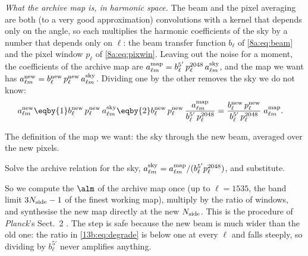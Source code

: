 \emph{What the archive map is, in harmonic space.} The beam and the pixel averaging are both (to a very good
approximation) convolutions with a kernel that depends only on the angle, so each multiplies the harmonic
coefficients of the sky by a number that depends only on $\ell$: the beam transfer function $b_\ell$ of
\eqref{8a:eq:beam} and the pixel window $p_\ell$ of \eqref{8a:eq:pixwin}. Leaving out the noise for a moment,
the coefficients of the archive map are $a^{\rm map}_{\ell m}=b^{5'}_\ell\,p^{2048}_\ell\,a^{\rm sky}_{\ell m}$, and
the map we want has $a^{\rm new}_{\ell m}=b^{\rm new}_\ell\,p^{\rm new}_\ell\,a^{\rm sky}_{\ell m}$. Dividing one
by the other removes the sky we do not know:
\begin{align}
  a^{\rm new}_{\ell m}
  &\eqby{1} b^{\rm new}_\ell\,p^{\rm new}_\ell\,a^{\rm sky}_{\ell m}
  \eqby{2} b^{\rm new}_\ell\,p^{\rm new}_\ell\,\frac{a^{\rm map}_{\ell m}}{b^{5'}_\ell\,p^{2048}_\ell}
  =\frac{b^{\rm new}_\ell\,p^{\rm new}_\ell}{b^{5'}_\ell\,p^{2048}_\ell}\;a^{\rm map}_{\ell m}.
  \label{13b:eq:degrade}
\end{align}
\begin{explain}
  \item The definition of the map we want: the sky through the new beam, averaged over the new pixels.
  \item Solve the archive relation for the sky, $a^{\rm sky}_{\ell m}=a^{\rm map}_{\ell m}/(b^{5'}_\ell p^{2048}_\ell)$,
        and substitute.
\end{explain}
So we compute the $\alm$ of the archive map once (up to $\ell=1535$, the band limit $3N_{\rm side}-1$ of the
finest working map), multiply by the ratio of windows, and synthesise the new map directly at the new
$N_{\rm side}$. This is the procedure of \textit{Planck}'s Sect.~2 \cite{Planck2018VII}. The step is safe because the
new beam is much wider than the old one: the ratio in \eqref{13b:eq:degrade} is below one at every $\ell$ and falls
steeply, so dividing by $b^{5'}_\ell$ never amplifies anything.

